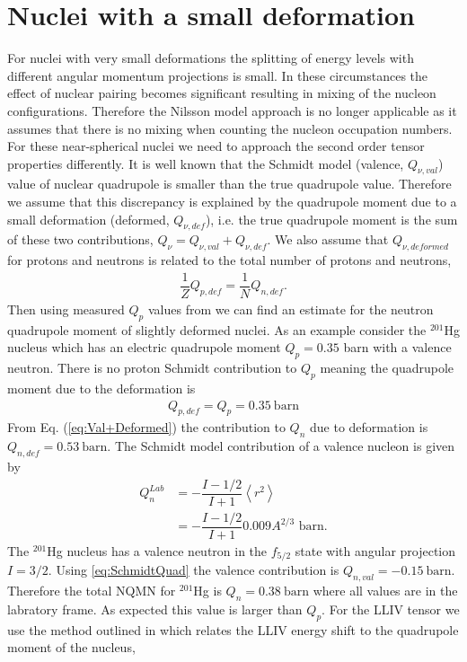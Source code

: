 \documentclass[8pt,a4paper, twoside]{report}
\begin{document}
\section{Nuclei with a small deformation} \label{sec:Minimal}

For nuclei with very small deformations the splitting of energy levels with different angular momentum projections is small.
 In these circumstances the effect of nuclear pairing becomes significant resulting in mixing of the nucleon configurations. Therefore the Nilsson model approach is no longer applicable as it assumes that there is no mixing when counting the nucleon occupation numbers. For these near-spherical nuclei we need to approach the second order tensor properties differently.  It is well known that the Schmidt model (valence, $Q_{\nu, val}$) value of nuclear quadrupole is smaller than the true quadrupole value. Therefore we assume that this discrepancy is explained by the quadrupole moment due to a small deformation (deformed, $Q_{\nu, def}$), i.e. the true quadrupole moment is the sum of these two contributions, $Q_{\nu} = Q_{\nu, val} + Q_{\nu, def}$. We also assume that $Q_{\nu,deformed}$ for protons and neutrons is related to the total number of protons and neutrons,
\begin{align} \label{eq:Val+Deformed}
\dfrac{1}{Z}Q_{p, def} = \dfrac{1}{N}Q_{n,def}.
\end{align}
Then using measured $Q_{p}$ values from \cite{Stone2005} we can find an estimate for the neutron quadrupole moment of slightly deformed nuclei. As an example consider the $^{201}$Hg nucleus which has an electric quadrupole moment $Q_{p} = 0.35 $ barn with a valence neutron. There is no proton Schmidt contribution to $Q_{p}$ meaning the quadrupole moment due to the deformation is 
\begin{align*}
Q_{p,def} = Q_{p} = 0.35 \ \text{barn}
\end{align*}
From Eq. (\ref{eq:Val+Deformed}) the contribution to $Q_{n}$ due to deformation is $Q_{n,def} = 0.53 \ \text{barn}$. The Schmidt model contribution of a valence nucleon is given by \cite{BohrMottVol1, Flambaum2016}
\begin{align} \label{eq:SchmidtQuad}
Q_{n}^{Lab} &= -\dfrac{I - 1/2}{I + 1}\left<r^2\right> \\
&= -\dfrac{I - 1/2}{I + 1}0.009A^{2/3} \text{ barn}.
\end{align}
 The $^{201}$Hg nucleus has a valence neutron in the $f_{5/2}$ state with angular projection $I =3/2$. Using \ref{eq:SchmidtQuad} the valence contribution is $Q_{n,val} = -0.15 \ \text{barn}$. Therefore the total NQMN for $^{201}$Hg is $Q_{n} = 0.38 \ \text{barn}$ where all values are in the labratory frame. As expected this value is larger than $Q_{p}$. For the LLIV tensor we use the method outlined in \cite{Flambaum2016} which relates the LLIV energy shift to the quadrupole moment of the nucleus,
\end{document}
